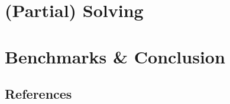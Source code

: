 \documentclass{report}
\theoremstyle{definition}
\begin{document}
\chapter{(Partial) Solving}


\chapter{Benchmarks \& Conclusion}





\newpage


\section*{References}
\printbibliography[heading=none]


\end{document}

